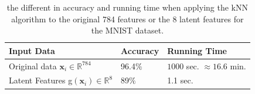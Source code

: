 \documentclass[12pt,a4]{article}
\begin{document}
\begin{table}[hbt]
\begin{adjustbox}{max width=\textwidth}
\begin{tabular}{p{4.89cm}p{4cm}p{4.59cm}}
\multicolumn{1}{p{4.9cm}}{Input Data} & 
\multicolumn{1}{p{4cm}}{Accuracy} & 
\multicolumn{1}{p{4.6cm}}{Running Time} \\ 
\hline
\multicolumn{1}{p{4.9cm}}{Original data \(\mathbf{x}_{i}\in\mathbb{R}^{784}\)} & 
\multicolumn{1}{p{4cm}}{96.4$\%$} & 
\multicolumn{1}{p{4.6cm}}{\( 1000\) sec. \( \approx 16.6\) min.} \\ 
\multicolumn{1}{p{4.9cm}}{Latent Features g\(\left(\mathbf{x}_{i}\right)\in\mathbb{R}^{8}\)} & 
\multicolumn{1}{p{4cm}}{89$\%$} & 
\multicolumn{1}{p{4.6cm}}{1.1 sec.} \\ 
\end{tabular}
\end{adjustbox}
\caption{the different in accuracy and running time when applying the kNN algorithm to the original 784 features or the 8 latent features for the MNIST dataset.}\label{tab:run1}
\end{table}
\end{document}
